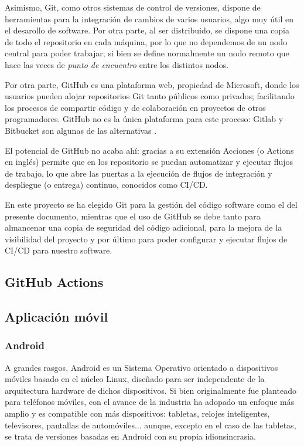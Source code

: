             Asimismo, Git, como otros sistemas de control de versiones, dispone de herramientas para la integración de
            cambios de varios usuarios, algo muy útil en el desarollo de software. Por otra parte, al ser distribuido,
            se dispone una copia de todo el repositorio en cada máquina, por lo que no dependemos de un nodo central
            para poder trabajar; si bien se define normalmente un nodo remoto que hace las veces de \textit{punto de
            encuentro} entre los distintos nodos. 

            Por otra parte, GitHub es una plataforma web, propiedad de Microsoft, donde los usuarios pueden alojar
            repositorios Git tanto públicos como privados; facilitando los procesos de compartir código y de 
            colaboración en proyectos de otros programadores. GitHub no es la única plataforma para este proceso: Gitlab
            y Bitbucket son algunas de las alternativas \cite{noauthor_git_2021}. 

            El potencial de GitHub no acaba ahí: gracias a su extensión Acciones (o Actions en inglés) permite que en
            los repositorio se puedan automatizar y ejecutar flujos de trabajo, lo que abre las puertas a la ejecución
            de flujos de integración y despliegue (o entrega) continuo, conocidos como CI/CD.

            En este proyecto se ha elegido Git para la gestión del código software como el del presente documento,
            mientras que el uso de GitHub se debe tanto para almancenar una copia de seguridad del código adicional, 
            para la mejora de la visibilidad del proyecto y por último para poder configurar y ejecutar flujos de CI/CD
            para nuestro software.

            
        \subsection{GitHub Actions}
    \subsection{Aplicación móvil}

        \subsubsection{Android}

            A grandes rasgos, Android es un Sistema Operativo orientado a dispositivos móviles basado en el núcleo 
            Linux, diseñado para ser independente de la arquitectura hardware de dichos dispositivos. 
            Si bien originalmente fue planteado para teléfonos móviles, con el avance de la industria ha adopado 
            un enfoque más amplio y es compatible con más dispositivos: tabletas, relojes inteligentes, televisores, 
            pantallas de automóviles... aunque, excepto en el caso de las tabletas, se trata de versiones basadas en
            Android con su propia idionsincrasia. 

